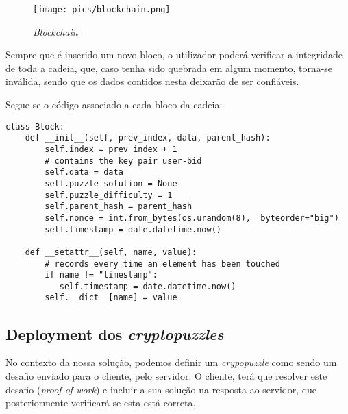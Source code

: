 \documentclass[12pt]{article}
\begin{document}
\vspace{5mm} %

\begin{figure}[h!]
    \centering
    \texttt{[image: pics/blockchain.png]}
    \caption{\textit{Blockchain}}
\end{figure}

\par Sempre que é inserido um novo bloco, o utilizador poderá verificar a integridade de toda a cadeia, que, caso tenha sido quebrada em algum momento, torna-se inválida, sendo que os dados contidos nesta deixarão de ser confiáveis.
\vspace{25mm} %


\par Segue-se o código associado a cada bloco da cadeia:

\vspace{5mm} %

\begin{lstlisting}[caption={Classe Block},captionpos=b]
class Block:
    def __init__(self, prev_index, data, parent_hash):
        self.index = prev_index + 1
        # contains the key pair user-bid
        self.data = data
        self.puzzle_solution = None
        self.puzzle_difficulty = 1
        self.parent_hash = parent_hash
        self.nonce = int.from_bytes(os.urandom(8),  byteorder="big")
        self.timestamp = date.datetime.now()
    
    def __setattr__(self, name, value):
        # records every time an element has been touched
        if name != "timestamp":
           self.timestamp = date.datetime.now()
        self.__dict__[name] = value

\end{lstlisting}







\subsection{Deployment dos \textit{cryptopuzzles}}

\par No contexto da nossa solução, podemos definir um \textit{crypopuzzle} como sendo um desafio enviado para o cliente, pelo servidor. O cliente, terá que resolver este desafio (\textit{proof of work}) e incluir a sua solução na resposta ao servidor, que posteriormente verificará se esta está correta.
\end{document}
